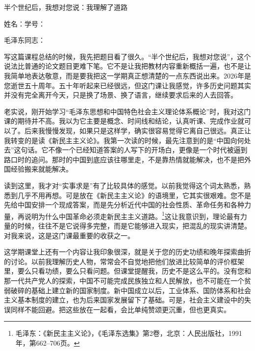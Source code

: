 \documentclass[12pt,a4paper]{ctexart}
\begin{document}
\begin{center}
    {\heiti 半个世纪后，我想对您说：我理解了道路\par}
    \vspace{0.8em}
    {\kaishu 姓名：\underline{\hspace{3.5cm}}\qquad 学号：\underline{\hspace{4cm}}\par}
\end{center}

\vspace{1em}

{\songti\setlength{\baselineskip}{20pt}\selectfont

毛泽东同志：

写这篇课程总结的时候，我先把题目看了很久。“半个世纪后，我想对您说”，这个说法比普通的论文题目更难下笔。它不是让我把教材内容重新概括一遍，也不是让我简单地表达敬意，而是要我把这一学期真正想清楚的一点东西说出来。2026年是您逝世五十周年。五十年听起来已经很远，但这门课让我感觉，许多历史问题其实并没有完全离开今天，只是换了场景、换了语言，继续要求后来的人去回答。

老实说，刚开始学习“毛泽东思想和中国特色社会主义理论体系概论”时，我对这门课的期待并不高。我以为它主要是概念、时间线和结论，认真听课、完成作业就可以了。后来我慢慢发现，如果只是这样学，确实很容易觉得它离自己很远。真正让我转变的是读《新民主主义论》。我第一次读的时候，最先注意到的是“中国向何处去”这句话。它不像一个已经知道答案的人写下的开场白，更像是一个时代被逼到路口时的追问。那时的中国到底应该往哪里走，不是靠热情就能解决，也不是把外国经验搬来就能解决。

读到这里，我才对“实事求是”有了比较具体的感觉。以前我觉得这个词太熟悉，熟悉到几乎不用再想。可是放在《新民主主义论》的语境里，它其实很艰难。您不是先给中国安排一个现成答案，而是先分析近代中国的社会性质、革命任务和各种力量，再说明为什么中国革命必须走新民主主义道路。\footnote{毛泽东：《新民主主义论》，《毛泽东选集》第2卷，北京：人民出版社，1991年，第662--706页。}这让我意识到，理论最有力量的时候，往往不是它说得多完整，而是它能够进入现实，把混乱的现实讲清楚。对我来说，这是这门课最重要的收获之一。

这学期课堂上还有一个内容让我印象很深，就是关于您的历史功绩和晚年探索曲折的讨论。以前我理解历史人物，常常会不自觉地把他们放进比较简单的评价框架里，要么只看功绩，要么只看问题。但课堂提醒我，历史不是这么平的。没有您和那一代共产党人的探索，中国不可能完成民族独立和人民解放，也不可能在一个贫弱破碎的基础上建立新的国家制度。新中国成立以后，工业体系、国防体系和社会主义基本制度的建立，也为后来国家发展留下了基础。可是，社会主义建设中的失误同样不能回避。把这些放在一起看，会比单纯赞颂更沉重，但也更真实。

}
\end{document}

